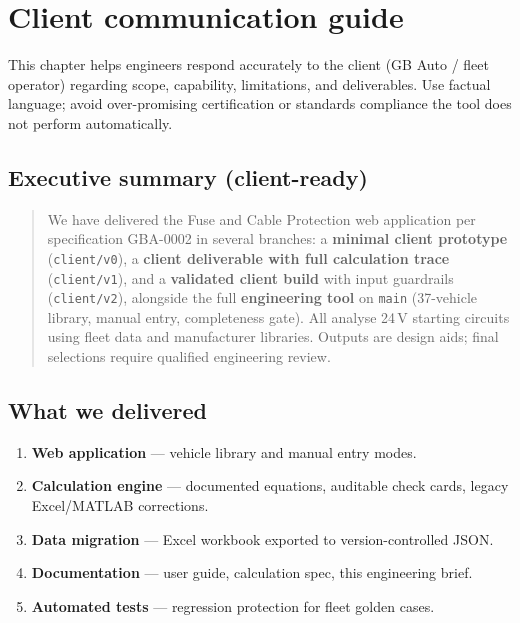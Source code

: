 \documentclass[11pt,a4paper]{report}
\begin{document}
\chapter{Client communication guide}
\label{ch:client}

This chapter helps engineers respond accurately to the client (GB Auto / fleet operator) regarding scope, capability, limitations, and deliverables. Use factual language; avoid over-promising certification or standards compliance the tool does not perform automatically.

\section{Executive summary (client-ready)}

\begin{quote}
\small
We have delivered the Fuse and Cable Protection web application per specification GBA-0002 in several branches: a \textbf{minimal client prototype} (\texttt{client/v0}), a \textbf{client deliverable with full calculation trace} (\texttt{client/v1}), and a \textbf{validated client build} with input guardrails (\texttt{client/v2}), alongside the full \textbf{engineering tool} on \texttt{main} (37-vehicle library, manual entry, completeness gate). All analyse 24\,V starting circuits using fleet data and manufacturer libraries. Outputs are design aids; final selections require qualified engineering review.
\end{quote}

\section{What we delivered}

\begin{enumerate}
  \item \textbf{Web application} --- vehicle library and manual entry modes.
  \item \textbf{Calculation engine} --- documented equations, auditable check cards, legacy Excel/MATLAB corrections.
  \item \textbf{Data migration} --- Excel workbook exported to version-controlled JSON.
  \item \textbf{Documentation} --- user guide, calculation spec, this engineering brief.
  \item \textbf{Automated tests} --- regression protection for fleet golden cases.
\end{enumerate}
\end{document}
